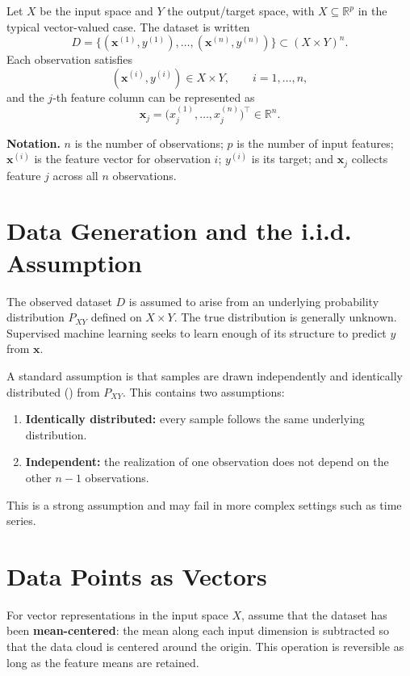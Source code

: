 \documentclass[11pt,a4paper]{article}
\newenvironment{formulabox}{\par\smallskip\begingroup\small\noindent\textbf{\color{MidGray}Notation.}\enspace}{\par\endgroup\smallskip}
\newcommand{\vect}[1]{\bm{#1}}
\newcommand{\R}{\mathbb{R}}
\newcommand{\iid}{\text{i.i.d.}}
\begin{document}
Let $X$ be the input space and $Y$ the output/target space, with $X\subseteq\R^p$ in the typical vector-valued case. The dataset is written
\begin{equation}
D=\{(\vect x^{(1)},y^{(1)}),\ldots,(\vect x^{(n)},y^{(n)})\}\subset (X\times Y)^n.
\label{eq:dataset}
\end{equation}
Each observation satisfies
\begin{equation}
(\vect x^{(i)},y^{(i)})\in X\times Y,\qquad i=1,\ldots,n,
\end{equation}
and the $j$-th feature column can be represented as
\begin{equation}
\vect x_j=\bigl(x_j^{(1)},\ldots,x_j^{(n)}\bigr)^\top\in\R^n.
\label{eq:feature-column}
\end{equation}

\begin{formulabox}
$n$ is the number of observations; $p$ is the number of input features; $\vect x^{(i)}$ is the feature vector for observation $i$; $y^{(i)}$ is its target; and $\vect x_j$ collects feature $j$ across all $n$ observations.
\end{formulabox}

\section{Data Generation and the i.i.d. Assumption}
The observed dataset $D$ is assumed to arise from an underlying probability distribution $P_{XY}$ defined on $X\times Y$. The true distribution is generally unknown. Supervised machine learning seeks to learn enough of its structure to predict $y$ from $\vect x$.

A standard assumption is that samples are drawn independently and identically distributed (\iid{}) from $P_{XY}$. This contains two assumptions:
\begin{enumerate}
  \item \textbf{Identically distributed:} every sample follows the same underlying distribution.
  \item \textbf{Independent:} the realization of one observation does not depend on the other $n-1$ observations.
\end{enumerate}
This is a strong assumption and may fail in more complex settings such as time series.

\section{Data Points as Vectors}
For vector representations in the input space $X$, assume that the dataset has been \textbf{mean-centered}: the mean along each input dimension is subtracted so that the data cloud is centered around the origin. This operation is reversible as long as the feature means are retained.
\end{document}
